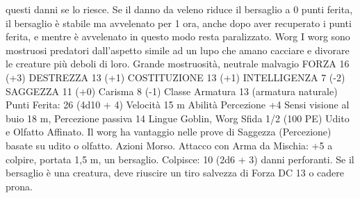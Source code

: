 \begin{multicols}{2}
questi danni se lo riesce. Se il danno da veleno riduce il bersaglio
a 0 punti ferita, il bersaglio è stabile ma avvelenato per 1 ora,
anche dopo aver recuperato i punti ferita, e mentre è avvelenato
in questo modo resta paralizzato.
Worg
I worg sono mostruosi predatori dall’aspetto simile ad
un lupo che amano cacciare e divorare le creature più
deboli di loro.
Grande mostruosità, neutrale malvagio
FORZA 16 (+3)
DESTREZZA 13 (+1)
COSTITUZIONE 13 (+1)
INTELLIGENZA 7 (-2)
SAGGEZZA 11 (+0)
Carisma 8 (-1)
Classe Armatura 13 (armatura naturale)
\hspace*{0pt}\hfill{Punti Ferita}: 26 (4d10 + 4)
Velocità 15 m
Abilità Percezione +4
Sensi visione al buio 18 m, Percezione passiva 14
Lingue Goblin, Worg
Sfida 1/2 (100 PE)
Udito e Olfatto Affinato. Il worg ha vantaggio nelle prove di
Saggezza (Percezione) basate su udito o olfatto.
Azioni
Morso. Attacco con Arma da Mischia: +5 a colpire, portata 1,5
m, un bersaglio.
Colpisce: 10 (2d6 + 3) danni perforanti. Se il bersaglio è una
creatura, deve riuscire un tiro salvezza di Forza DC 13 o cadere
prona.
 

\end{multicols}
